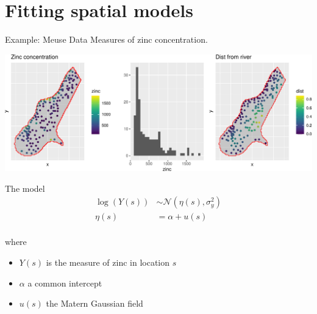 \documentclass[
  ignorenonframetext,
]{beamer}
\begin{document}
\hypertarget{fitting-spatial-models}{%
\section{Fitting spatial models}\label{fitting-spatial-models}}

\begin{frame}{Example: Meuse Data}
\protect\hypertarget{example-meuse-data}{}
Measures of zinc concentration.

\begin{center}\includegraphics[width=0.8\linewidth,height=0.8\textheight]{Part3_advanced_files/figure-beamer/unnamed-chunk-9-1} \end{center}
\end{frame}

\begin{frame}{The model}
\protect\hypertarget{the-model}{}
\[
\begin{aligned}
\log(Y(s)) &\sim \mathcal{N}(\eta(s),\sigma^2_y)\\
\eta(s)& = \alpha + u(s)\\
\end{aligned}
\]

where

\begin{itemize}
\item
  \(Y(s)\) is the measure of zinc in location \(s\)
\item
  \(\alpha\) a common intercept
\item
  \(u(s)\) the Matern Gaussian field
\end{itemize}
\end{frame}
\end{document}
